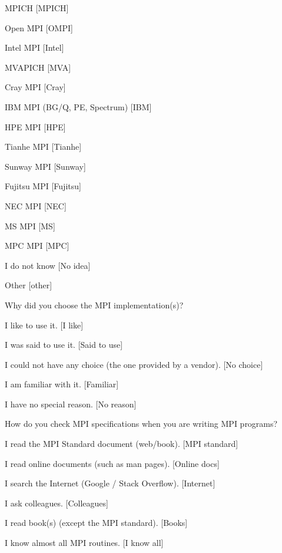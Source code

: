\documentclass[conference,10pt,letterpaper]{IEEEtran}
\begin{document}
{{\begin{description}
    \begin{inparaenum}[{\bf C}1)]
    \item MPICH [MPICH]
    \item Open MPI [OMPI]
    \item Intel MPI [Intel]
    \item MVAPICH [MVA]
    \item Cray MPI [Cray]
    \item IBM MPI (BG/Q, PE, Spectrum) [IBM]
    \item HPE MPI [HPE]
    \item Tianhe MPI [Tianhe]
    \item Sunway MPI [Sunway]
    \item Fujitsu MPI [Fujitsu]
    \item NEC MPI [NEC]
    \item MS MPI [MS]
    \item MPC MPI [MPC]
    \item I do not know [No idea]
    \item Other [other]
    \end{inparaenum}
  \item[Q13:] Why did you choose the MPI implementation(s)?
    \begin{inparaenum}[{\bf C}1)]
    \item I like to use it. [I like]
    \item I was said to use it. [Said to use]
    \item I could not have any choice (the one provided by a vendor). [No choice]
    \item I am familiar with it. [Familiar]
    \item I have no special reason. [No reason]
    \end{inparaenum}
  \item[Q14*:] How do you check MPI specifications when you are writing MPI programs?
    \begin{inparaenum}[{\bf C}1)]
    \item I read the MPI Standard document (web/book). [MPI standard]
    \item I read online documents (such as man pages). [Online docs]
    \item I search the Internet (Google / Stack Overflow). [Internet]
    \item I ask colleagues. [Colleagues]
    \item I read book(s) (except the MPI standard). [Books]
    \item I know almost all MPI routines. [I know all]

\end{inparaenum}
\end{description}}}
\end{document}
